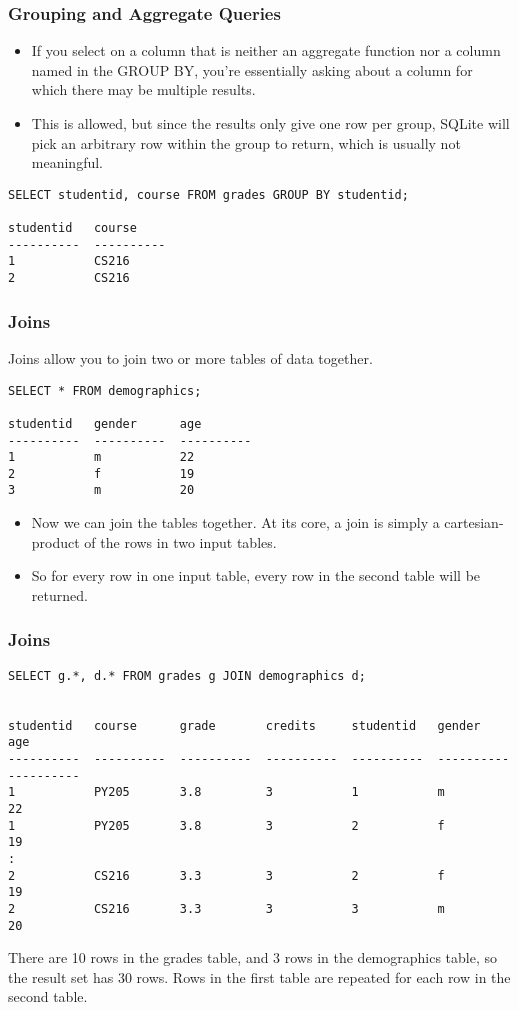 \begin{frame}[fragile] \frametitle{Grouping and Aggregate Queries}
\begin{itemize}
\item  If you select on a column that is neither an aggregate function nor a column named in the GROUP BY, you're essentially asking about a column for which there may be multiple results. \item This is allowed, but since the results only give one row per group, SQLite will pick an arbitrary row within the group to return, which is usually not meaningful.
\end{itemize}
\begin{lstlisting}
SELECT studentid, course FROM grades GROUP BY studentid;

studentid   course    
----------  ----------
1           CS216     
2           CS216   
\end{lstlisting}
\end{frame}

\begin{frame}[fragile] \frametitle{Joins}
Joins allow you to join two or more tables of data together.
\begin{lstlisting}
SELECT * FROM demographics;

studentid   gender      age       
----------  ----------  ----------
1           m           22        
2           f           19        
3           m           20        
\end{lstlisting}
\begin{itemize}
\item  Now we can join the tables together. At its core, a join is simply a cartesian-product of the rows in two input tables. 
\item  So for every row in one input table, every row in the second table will be returned.
\end{itemize}
\end{frame}

\begin{frame}[fragile] \frametitle{Joins}
\begin{lstlisting}
SELECT g.*, d.* FROM grades g JOIN demographics d;


studentid   course      grade       credits     studentid   gender      age       
----------  ----------  ----------  ----------  ----------  ----------  ----------
1           PY205       3.8         3           1           m           22        
1           PY205       3.8         3           2           f           19        
:        
2           CS216       3.3         3           2           f           19        
2           CS216       3.3         3           3           m           20        
\end{lstlisting}
There are 10 rows in the grades table, and 3 rows in the demographics table, so the result set has 30 rows. Rows in the first table are repeated for each row in the second table.
\end{frame}

